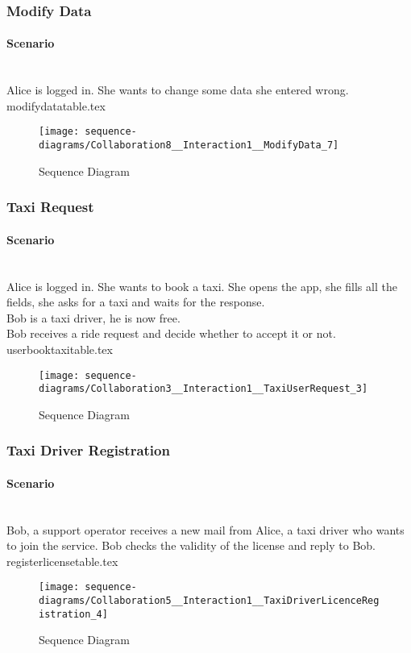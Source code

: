 \subsubsection{Modify Data} 
\label{ssub:modify_scenario}
\paragraph{Scenario} \hfill \\
Alice is logged in. She wants to change some data she entered wrong. 
{modifydatatable.tex}
\newpage
\vfill
\begin{figure}
\caption{Sequence Diagram}
\texttt{[image: sequence-diagrams/Collaboration8\_\_Interaction1\_\_ModifyData\_7]}
\centering
\end{figure}
\vfill
\clearpage

\subsubsection{Taxi Request} 
\label{ssub:taxirequest_scenario}
\paragraph{Scenario} \hfill \\
Alice is logged in. She wants to book a taxi. She opens the app, she fills all the fields, she asks for a taxi and waits for the response.\\
Bob is a taxi driver, he is now free.\\
Bob receives a ride request and decide whether to accept it or not.
{userbooktaxitable.tex}
\newpage
\vfill
\begin{figure}
\caption{Sequence Diagram}
\texttt{[image: sequence-diagrams/Collaboration3\_\_Interaction1\_\_TaxiUserRequest\_3]}
\centering
\end{figure}
\vfill
\clearpage

\subsubsection{Taxi Driver Registration} 
\label{ssub:taxidriverregisration_scenario}
\paragraph{Scenario} \hfill \\
Bob, a support operator receives a new mail from Alice, a taxi driver who wants to join the service. Bob checks the validity of the license and reply to Bob.
{registerlicensetable.tex}
\newpage
\vfill
\begin{figure}
\caption{Sequence Diagram}
\texttt{[image: sequence-diagrams/Collaboration5\_\_Interaction1\_\_TaxiDriverLicenceRegistration\_4]}
\centering
\end{figure}
\vfill
\clearpage

